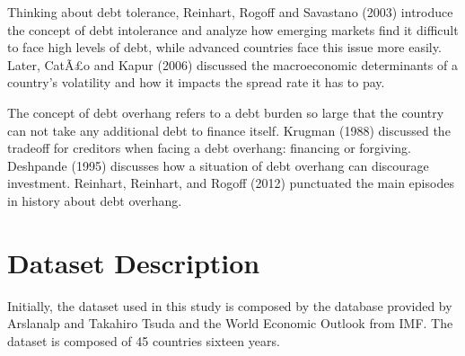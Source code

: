\documentclass[]{article}
\begin{document}
Thinking about debt tolerance, Reinhart, Rogoff and Savastano (2003)
introduce the concept of debt intolerance and analyze how emerging
markets find it difficult to face high levels of debt, while advanced
countries face this issue more easily. Later, CatÃ£o and Kapur (2006)
discussed the macroeconomic determinants of a country's volatility and
how it impacts the spread rate it has to pay.

The concept of debt overhang refers to a debt burden so large that the
country can not take any additional debt to finance itself. Krugman
(1988) discussed the tradeoff for creditors when facing a debt overhang:
financing or forgiving. Deshpande (1995) discusses how a situation of
debt overhang can discourage investment. Reinhart, Reinhart, and Rogoff
(2012) punctuated the main episodes in history about debt overhang.

\section{Dataset Description}\label{dataset-description}

Initially, the dataset used in this study is composed by the database
provided by Arslanalp and Takahiro Tsuda and the World Economic Outlook
from IMF. The dataset is composed of 45 countries sixteen years.
\end{document}
